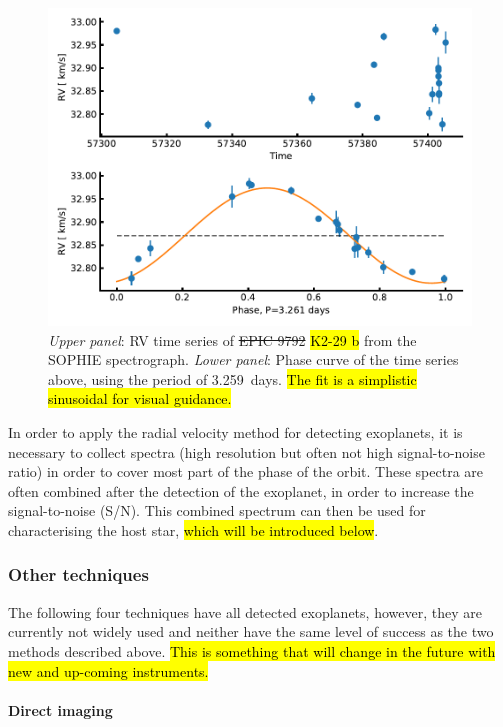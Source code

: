 \begin{figure}[htpb!]
    \centering
    \includegraphics[width=1.0\linewidth]{figures/RVmethod.pdf}
    \caption{\emph{Upper panel}: RV time series of \st{EPIC 9792} \hl{K2-29 b} from the SOPHIE spectrograph.
             \emph{Lower panel}: Phase curve of the time series above, using the period of
             \SI{3.259}{days}. \hl{The fit is a simplistic sinusoidal for visual guidance.}}
    \label{fig:rvmethod}
\end{figure}

In order to apply the radial velocity method for detecting exoplanets, it is necessary to collect
spectra (high resolution but often not high signal-to-noise ratio) in order to cover most part of
the phase of the orbit. These spectra are often combined after the detection of the exoplanet, in
order to increase the signal-to-noise (S/N). This combined spectrum can then be used for
characterising the host star, \hl{which will be introduced below}.


\subsubsection{Other techniques}

The following four techniques have all detected exoplanets, however, they are currently not widely
used and neither have the same level of success as the two methods described above. \hl{This is
something that will change in the future with new and up-coming instruments.}

\paragraph{Direct imaging}

